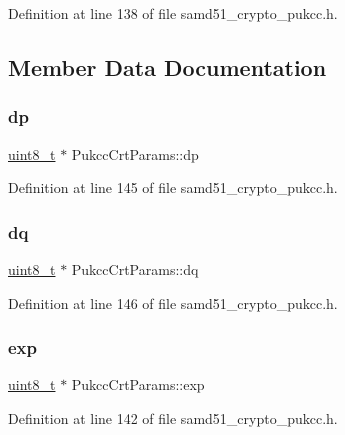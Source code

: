 Definition at line 138 of file samd51\+\_\+crypto\+\_\+pukcc.\+h.



\subsection{Member Data Documentation}
\mbox{\label{structPukccCrtParams_afe9cb1b2f9c9dc05c783f549775fcb9f}} 
\subsubsection{\texorpdfstring{dp}{dp}}
{\footnotesize\ttfamily \hyperlink{stdint_8h_aba7bc1797add20fe3efdf37ced1182c5}{uint8\+\_\+t} $\ast$ Pukcc\+Crt\+Params\+::dp}



Definition at line 145 of file samd51\+\_\+crypto\+\_\+pukcc.\+h.

\mbox{\label{structPukccCrtParams_a13b12b088c048b95c1f5dd13f30e6358}} 
\subsubsection{\texorpdfstring{dq}{dq}}
{\footnotesize\ttfamily \hyperlink{stdint_8h_aba7bc1797add20fe3efdf37ced1182c5}{uint8\+\_\+t} $\ast$ Pukcc\+Crt\+Params\+::dq}



Definition at line 146 of file samd51\+\_\+crypto\+\_\+pukcc.\+h.

\mbox{\label{structPukccCrtParams_a8a0949e50242ef77f8778e7e79bf29ca}} 
\subsubsection{\texorpdfstring{exp}{exp}}
{\footnotesize\ttfamily \hyperlink{stdint_8h_aba7bc1797add20fe3efdf37ced1182c5}{uint8\+\_\+t} $\ast$ Pukcc\+Crt\+Params\+::exp}



Definition at line 142 of file samd51\+\_\+crypto\+\_\+pukcc.\+h.

